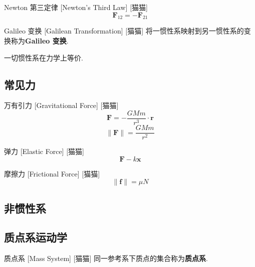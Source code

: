 \documentclass[UTF8]{ctexart}
\begin{document}
        \begin{axm}
            []
            {Newton 第三定律}
            [Newton's Third Law]
            [猫猫]
            \[\bm{F}_{12}=-\bm{F}_{21}\]
        \end{axm}
        
        \begin{axm}
            []
            {Galileo 变换}
            [Galilean Transformation]
            [猫猫]
            将一惯性系映射到另一惯性系的变换称为\textbf{Galileo 变换}. 

            一切惯性系在力学上等价. 
        \end{axm}

    \subsection{常见力}
        
        \begin{axm}
            []
            {万有引力}
            [Gravitational Force]
            [猫猫]
            \[\bm{F}=-\frac{GMm}{r^3}\cdot\bm{r}\]
            \[\|\bm{F}\|=\frac{GMm}{r^2}\]
        \end{axm}
        
        \begin{axm}
            []
            {弹力}
            [Elastic Force]
            [猫猫]
            \[\bm{F}-k\bm{x}\]
        \end{axm}
        
        \begin{axm}
            []
            {摩擦力}
            [Frictional Force]
            [猫猫]
            \[\|\bm{f}\|=\mu N\]
        \end{axm}

    \subsection{非惯性系}

    \subsection{质点系运动学}
        
        \begin{dfn}
            []
            {质点系}
            [Mass System]
            [猫猫]
            同一参考系下质点的集合称为\textbf{质点系}. 
        \end{dfn}
        
\end{document}
